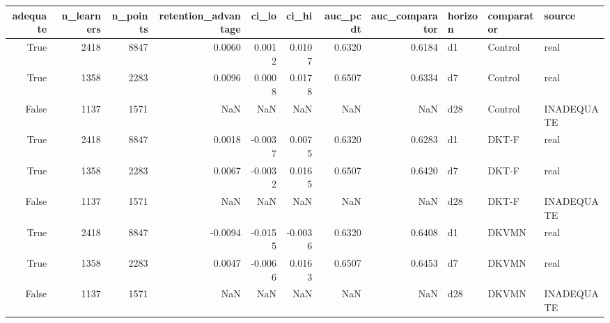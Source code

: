\begin{tabular}{rrrrrrrrlll}
\toprule
adequate & n\_learners & n\_points & retention\_advantage & ci\_lo & ci\_hi & auc\_pcdt & auc\_comparator & horizon & comparator & source \\
\midrule
True & 2418 & 8847 & 0.0060 & 0.0012 & 0.0107 & 0.6320 & 0.6184 & d1 & Control & real \\
True & 1358 & 2283 & 0.0096 & 0.0008 & 0.0178 & 0.6507 & 0.6334 & d7 & Control & real \\
False & 1137 & 1571 & NaN & NaN & NaN & NaN & NaN & d28 & Control & INADEQUATE \\
True & 2418 & 8847 & 0.0018 & -0.0037 & 0.0075 & 0.6320 & 0.6283 & d1 & DKT-F & real \\
True & 1358 & 2283 & 0.0067 & -0.0032 & 0.0165 & 0.6507 & 0.6420 & d7 & DKT-F & real \\
False & 1137 & 1571 & NaN & NaN & NaN & NaN & NaN & d28 & DKT-F & INADEQUATE \\
True & 2418 & 8847 & -0.0094 & -0.0155 & -0.0036 & 0.6320 & 0.6408 & d1 & DKVMN & real \\
True & 1358 & 2283 & 0.0047 & -0.0066 & 0.0163 & 0.6507 & 0.6453 & d7 & DKVMN & real \\
False & 1137 & 1571 & NaN & NaN & NaN & NaN & NaN & d28 & DKVMN & INADEQUATE \\
\bottomrule
\end{tabular}
